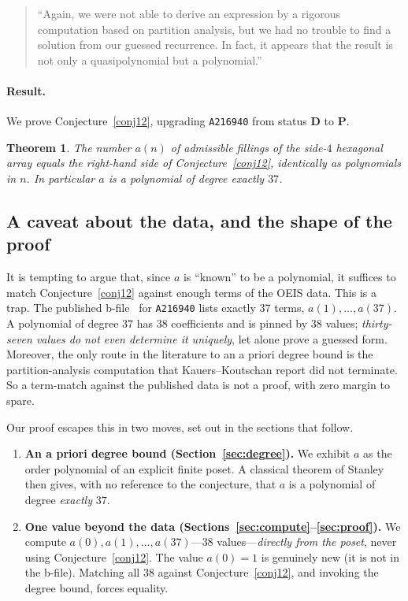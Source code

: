 \documentclass[11pt]{article}
\theoremstyle{plain}
\newtheorem{theorem}{Theorem}
\theoremstyle{definition}
\theoremstyle{remark}
\newcommand{\OEIS}[1]{\texttt{#1}}
\begin{document}
\begin{quote}
``Again, we were not able to derive an expression by a rigorous computation based on partition
analysis, but we had no trouble to find a solution from our guessed recurrence. In fact, it
appears that the result is not only a quasipolynomial but a polynomial.''
\end{quote}

\paragraph{Result.} We prove Conjecture~\ref{conj12}, upgrading \OEIS{A216940} from status
\textbf{D} to \textbf{P}.

\begin{theorem}\label{main}
The number $a(n)$ of admissible fillings of the side-$4$ hexagonal array equals the right-hand
side of Conjecture~\ref{conj12}, identically as polynomials in $n$. In particular $a$ is a
polynomial of degree exactly $37$.
\end{theorem}

\subsection{A caveat about the data, and the shape of the proof}

It is tempting to argue that, since $a$ is ``known'' to be a polynomial, it suffices to match
Conjecture~\ref{conj12} against enough terms of the OEIS data. This is a trap. The published
b-file~\cite{OEIS} for \OEIS{A216940} lists exactly $37$ terms, $a(1),\dots,a(37)$. A
polynomial of degree $37$ has $38$ coefficients and is pinned by $38$ values;
\emph{thirty-seven values do not even determine it uniquely}, let alone prove a guessed form.
Moreover, the only route in the literature to an a priori degree bound is the
partition-analysis computation that Kauers--Koutschan report did not terminate. So a
term-match against the published data is not a proof, with zero margin to spare.

Our proof escapes this in two moves, set out in the sections that follow.
\begin{enumerate}[leftmargin=1.4em]
  \item \textbf{An a priori degree bound (Section~\ref{sec:degree}).} We exhibit $a$ as the
  order polynomial of an explicit finite poset. A classical theorem of Stanley then gives,
  with no reference to the conjecture, that $a$ is a polynomial of degree \emph{exactly} $37$.
  \item \textbf{One value beyond the data (Sections~\ref{sec:compute}--\ref{sec:proof}).} We
  compute $a(0),a(1),\dots,a(37)$---$38$ values---\emph{directly from the poset}, never using
  Conjecture~\ref{conj12}. The value $a(0)=1$ is genuinely new (it is not in the b-file).
  Matching all $38$ against Conjecture~\ref{conj12}, and invoking the degree bound, forces
  equality.
\end{enumerate}
\end{document}

